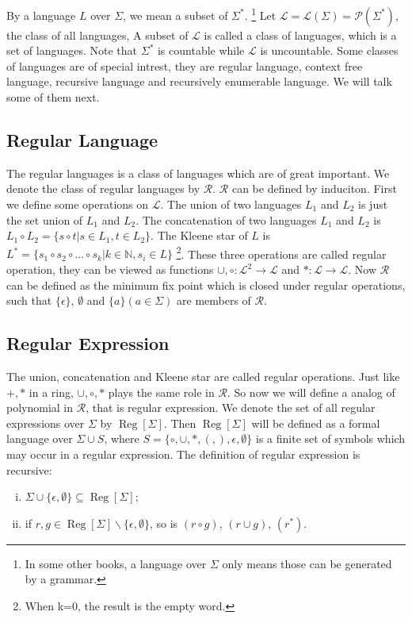 \documentclass{article}
\def\Reg{\mathop{\mathrm{Reg}}}
\begin{document}
By a language $L$ over $\Sigma$, we mean a subset of $\Sigma^\ast$.
\footnote{In some other books, a language over $\Sigma$ only means those can be generated by a grammar.}
Let $\mathcal{L} = \mathcal{L}(\Sigma) = \mathcal{P}(\Sigma^\ast)$, the class of all languages,
A subset of $\mathcal{L}$ is called a class of languages, which is a set of languages.
Note that $\Sigma^\ast$ is countable while $\mathcal{L}$ is uncountable.
Some classes of languages are of special intrest, they are regular language,
context free language, recursive language and recursively enumerable language.
We will talk some of them next.

\subsection{Regular Language}
The regular languages is a class of languages which are of great important.
We denote the class of regular languages by $\mathcal{R}$.
$\mathcal{R}$ can be defined by induciton.
First we define some operations on $\mathcal{L}$.
The union of two languages $L_1$ and $L_2$ is just the set union of $L_1$ and $L_2$.
The concatenation of two languages $L_1$ and $L_2$ is
$L_1 \circ L_2 = \{s\circ t \vert s \in L_1, t \in L_2\}$.
The Kleene star of $L$ is
$L^\ast = \{s_1 \circ s_2\circ \dots \circ s_k \vert k \in \mathbb{N}, s_i \in L\}$
\footnote{When k=0, the result is the empty word.}.
These three operations are called regular operation,
they can be viewed as functions $\cup, \circ : \mathcal{L}^2 \to \mathcal{L}$
and $\ast : \mathcal{L} \to \mathcal{L}$.
Now $\mathcal{R}$ can be defined as the minimum fix point which is closed under regular operations,
such that $\{\epsilon\}$, $\emptyset$ and $\{a\}(a \in \Sigma)$ are members of $\mathcal{R}$.

\subsection{Regular Expression}
The union, concatenation and Kleene star are called regular operations.
Just like $+, \ast$ in a ring, $\cup, \circ, \ast$ plays the same role in $\mathcal{R}$.
So now we will define a analog of polynomial in $\mathcal{R}$, that is regular expression.
We denote the set of all regular expressions over $\Sigma$ by $\Reg[\Sigma]$.
Then $\Reg[\Sigma]$ will be defined as a formal language over $\Sigma \cup S$, 
where $S = \{\circ, \cup, \ast, (, ), \epsilon, \emptyset\}$
is a finite set of symbols which may occur in a regular expression.
The definition of regular expression is recursive:
\begin{enumerate}[i).]
\item $\Sigma \cup \{\epsilon, \emptyset\} \subseteq \Reg[\Sigma]$;
\item if $r, g \in \Reg[\Sigma] \backslash \{\epsilon, \emptyset\}$,
so is $(r \circ g)$, $(r \cup g)$, $(r^\ast)$.
\end{enumerate}
\end{document}
